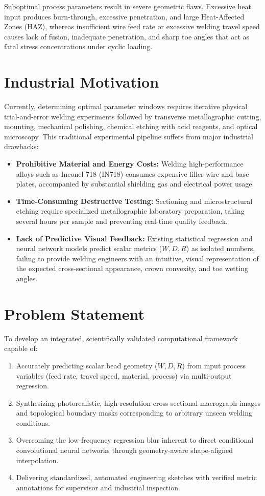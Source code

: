 \documentclass[12pt,a4paper,oneside]{report}
\begin{document}
Suboptimal process parameters result in severe geometric flaws. Excessive heat input produces burn-through, excessive penetration, and large Heat-Affected Zones (HAZ), whereas insufficient wire feed rate or excessive welding travel speed causes lack of fusion, inadequate penetration, and sharp toe angles that act as fatal stress concentrations under cyclic loading.

\section{Industrial Motivation}
Currently, determining optimal parameter windows requires iterative physical trial-and-error welding experiments followed by transverse metallographic cutting, mounting, mechanical polishing, chemical etching with acid reagents, and optical microscopy. This traditional experimental pipeline suffers from major industrial drawbacks:
\begin{itemize}
    \item \textbf{Prohibitive Material and Energy Costs:} Welding high-performance alloys such as Inconel 718 (IN718) consumes expensive filler wire and base plates, accompanied by substantial shielding gas and electrical power usage.
    \item \textbf{Time-Consuming Destructive Testing:} Sectioning and microstructural etching require specialized metallographic laboratory preparation, taking several hours per sample and preventing real-time quality feedback.
    \item \textbf{Lack of Predictive Visual Feedback:} Existing statistical regression and neural network models predict scalar metrics ($W, D, R$) as isolated numbers, failing to provide welding engineers with an intuitive, visual representation of the expected cross-sectional appearance, crown convexity, and toe wetting angles.
\end{itemize}

\section{Problem Statement}
To develop an integrated, scientifically validated computational framework capable of:
\begin{enumerate}
    \item Accurately predicting scalar bead geometry ($W, D, R$) from input process variables (feed rate, travel speed, material, process) via multi-output regression.
    \item Synthesizing photorealistic, high-resolution cross-sectional macrograph images and topological boundary masks corresponding to arbitrary unseen welding conditions.
    \item Overcoming the low-frequency regression blur inherent to direct conditional convolutional neural networks through geometry-aware shape-aligned interpolation.
    \item Delivering standardized, automated engineering sketches with verified metric annotations for supervisor and industrial inspection.
\end{enumerate}
\end{document}
